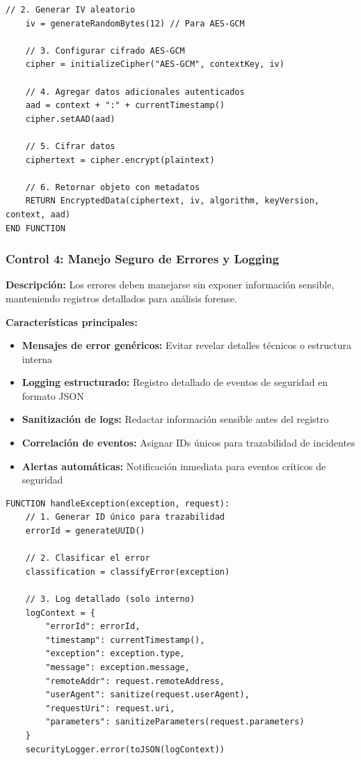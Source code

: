 {\begin{lstlisting}[language=pseudocode, caption=Cifrado de datos sensibles]
    // 2. Generar IV aleatorio
    iv = generateRandomBytes(12) // Para AES-GCM
    
    // 3. Configurar cifrado AES-GCM
    cipher = initializeCipher("AES-GCM", contextKey, iv)
    
    // 4. Agregar datos adicionales autenticados
    aad = context + ":" + currentTimestamp()
    cipher.setAAD(aad)
    
    // 5. Cifrar datos
    ciphertext = cipher.encrypt(plaintext)
    
    // 6. Retornar objeto con metadatos
    RETURN EncryptedData(ciphertext, iv, algorithm, keyVersion, context, aad)
END FUNCTION
\end{lstlisting}

\subsubsection{Control 4: Manejo Seguro de Errores y Logging}

\textbf{Descripción:} Los errores deben manejarse sin exponer información sensible, manteniendo registros detallados para análisis forense.

\textbf{Características principales:}
\begin{itemize}
    \item \textbf{Mensajes de error genéricos:} Evitar revelar detalles técnicos o estructura interna
    \item \textbf{Logging estructurado:} Registro detallado de eventos de seguridad en formato JSON
    \item \textbf{Sanitización de logs:} Redactar información sensible antes del registro
    \item \textbf{Correlación de eventos:} Asignar IDs únicos para trazabilidad de incidentes
    \item \textbf{Alertas automáticas:} Notificación inmediata para eventos críticos de seguridad
\end{itemize}

\begin{lstlisting}[language=pseudocode, caption=Manejo seguro de errores]
FUNCTION handleException(exception, request):
    // 1. Generar ID único para trazabilidad
    errorId = generateUUID()
    
    // 2. Clasificar el error
    classification = classifyError(exception)
    
    // 3. Log detallado (solo interno)
    logContext = {
        "errorId": errorId,
        "timestamp": currentTimestamp(),
        "exception": exception.type,
        "message": exception.message,
        "remoteAddr": request.remoteAddress,
        "userAgent": sanitize(request.userAgent),
        "requestUri": request.uri,
        "parameters": sanitizeParameters(request.parameters)
    }
    securityLogger.error(toJSON(logContext))
    

\end{lstlisting}}
